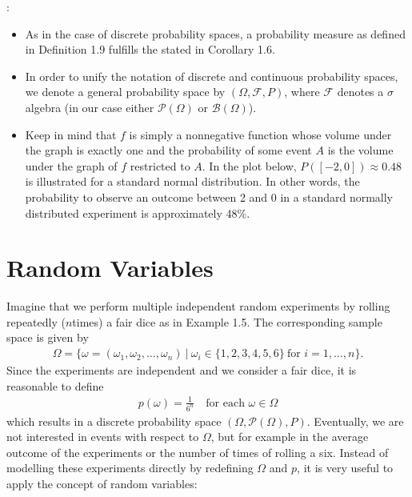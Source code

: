 \documentclass[letterpaper,10pt,english]{jupyterBook}
\begin{document}
\sphinxAtStartPar
{}:
\begin{itemize}
\item {} 
\sphinxAtStartPar
As in the case of discrete probability spaces, a probability measure as defined in Definition 1.9 fulfills the  stated in Corollary 1.6.

\item {} 
\sphinxAtStartPar
In order to unify the notation of discrete and continuous probability spaces, we denote a general probability space by \((\Omega, \mathcal{F}, P)\), where \(\mathcal{F}\) denotes a \(\sigma\)\sphinxhyphen{}algebra (in our case either \(\mathcal{P}(\Omega)\) or \(\mathcal{B}(\Omega)\)).

\item {} 
\sphinxAtStartPar
Keep in mind that \(f\) is simply a non\sphinxhyphen{}negative function whose volume under the graph is exactly one and the probability of some event \(A\) is the volume under the graph of \(f\) restricted to \(A\). In the plot below, \(P([-2, 0]) \approx 0.48\) is illustrated for a standard normal distribution. In other words, the probability to observe an outcome between \sphinxhyphen{}2 and 0 in a standard normally distributed experiment is approximately 48\%.

\end{itemize}

\sphinxAtStartPar
{}


\section{Random Variables}
\label{\detokenize{fund/fundprob:random-variables}}
\sphinxAtStartPar
Imagine that we perform multiple independent random experiments by rolling repeatedly (\(n\)\sphinxhyphen{}times) a fair dice as in Example 1.5. The corresponding sample space is given by
\begin{equation*}
\begin{split}\Omega = \{ \omega = (\omega_1, \omega_2, \dots, \omega_n)~|~\omega_i \in \{1, 2, 3, 4, 5, 6\} \ \text{for } i=1, \dots,n \}.\end{split}
\end{equation*}
\sphinxAtStartPar
Since the experiments are independent and we consider a fair dice, it is reasonable to define
\begin{equation*}
\begin{split} p(\omega) = \frac{1}{6^n} \quad \text{for each } \omega \in \Omega\end{split}
\end{equation*}
\sphinxAtStartPar
which results in a discrete probability space \((\Omega, \mathcal{P}(\Omega), P)\). Eventually, we are not interested in events with respect to \(\Omega\), but for example in the average outcome of the experiments or the number of times of rolling a six. Instead of modelling these experiments directly by redefining \(\Omega\) and \(p\), it is very useful to apply the concept of random variables:
\end{document}
